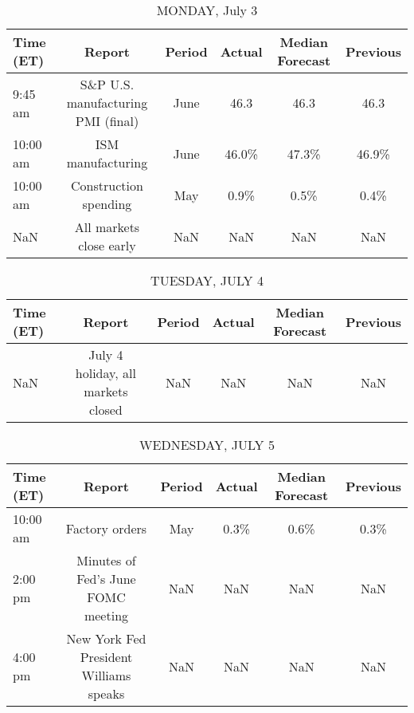 \documentclass{article}%
\begin{document}
%
\normalsize%


\begin{table}[htbp]%
\caption{MONDAY, July 3}%
\centering%
\begin{adjustbox}{width=1\textwidth}%
\begin{tabular}{lccccc}
\toprule
Time (ET) &                             Report & Period & Actual & Median Forecast & Previous \\
\midrule
  9:45 am & S\&P U.S. manufacturing PMI (final) &   June &   46.3 &            46.3 &     46.3 \\
 10:00 am &                  ISM manufacturing &   June &  46.0\% &           47.3\% &    46.9\% \\
 10:00 am &              Construction spending &    May &   0.9\% &            0.5\% &     0.4\% \\
      NaN &            All markets close early &    NaN &    NaN &             NaN &      NaN \\
\bottomrule
\end{tabular}
%
\end{adjustbox}%
\end{table}

%


\begin{table}[htbp]%
\caption{TUESDAY, JULY 4}%
\centering%
\begin{adjustbox}{width=1\textwidth}%
\begin{tabular}{lccccc}
\toprule
Time (ET) &                             Report & Period & Actual & Median Forecast & Previous \\
\midrule
      NaN & July 4 holiday, all markets closed &    NaN &    NaN &             NaN &      NaN \\
\bottomrule
\end{tabular}
%
\end{adjustbox}%
\end{table}

%


\begin{table}[htbp]%
\caption{WEDNESDAY, JULY 5}%
\centering%
\begin{adjustbox}{width=1\textwidth}%
\begin{tabular}{lccccc}
\toprule
Time (ET) &                                 Report & Period & Actual & Median Forecast & Previous \\
\midrule
 10:00 am &                         Factory orders &    May &   0.3\% &            0.6\% &     0.3\% \\
  2:00 pm &     Minutes of Fed's June FOMC meeting &    NaN &    NaN &             NaN &      NaN \\
  4:00 pm & New York Fed President Williams speaks &    NaN &    NaN &             NaN &      NaN \\
\bottomrule
\end{tabular}
%
\end{adjustbox}%
\end{table}
\end{document}
